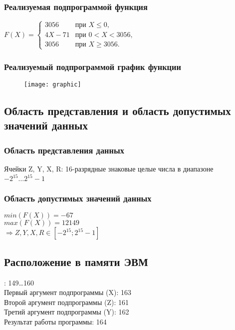 \subsubsection{Реализуемая подпрограммой функция}
\begin{center}
$F(X) = \begin{cases}
3056 & \text{при } X \leqslant 0,\\
4X-71 & \text{при } 0<X<3056,\\
3056 & \text{при } X \geqslant 3056.
\end{cases}$
\end{center}

\subsubsection{Реализуемый подпрограммой график функции}
\begin{figure}[H]
\centering
\texttt{[image: graphic]}
\label{pic:graphic}
\end{figure}

\subsection{Область представления и область допустимых значений данных}
\subsubsection{Область представления данных}
\noindent Ячейки Z, Y, X, R: 16-разрядные знаковые целые числа в диапазоне $-2^{15}\ldots2^{15}-1$

\subsubsection{Область допустимых значений данных}
\noindent $min(F(X))=-67$\\
$max(F(X))=12149$\\
$\Rightarrow Z, Y, X, R \in [-2^{15}; 2^{15}-1]$

\subsection{Расположение в памяти ЭВМ}
: 149\ldots160\\
Первый аргумент подпрограммы (X): 163\\
Второй аргумент подпрограммы (Z): 161\\
Третий аргумент подпрограммы (Y): 162\\
Результат работы программы: 164\\

